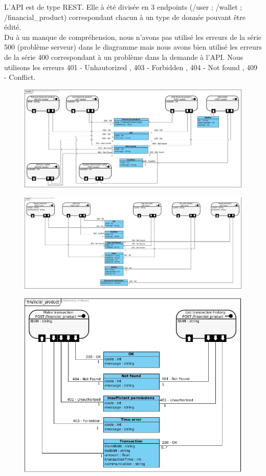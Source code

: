 \documentclass[../rapport.tex]{subfiles}
\begin{document}
L'API est de type REST. Elle à été divisée en 3 endpoints (/user ; /wallet ; /financial\_product) correspondant chacun à un type de donnée pouvant être édité. \\ 
Du à un manque de compréhension, nous n'avons pas utilisé les erreurs de la série 500 (problème serveur) dans le diagramme mais nous avons bien utilisé les erreurs de la série 400 correspondant à un problème dans la demande à l'API. Nous utilisons les erreurs 401 - Unhautorized , 403 - Forbidden , 404 - Not found , 409 - Conflict.

\begin{figure}[H]
    \includegraphics[scale=0.288]{ressources/photos_diagrammes/API/wallet.jpg}
\end{figure}

\begin{figure}[H]
    \includegraphics[scale=0.26]{ressources/photos_diagrammes/API/user.jpg}
\end{figure}


\begin{figure}[H]
    \includegraphics[scale=0.54]{ressources/photos_diagrammes/API/financial_product.jpg}
\end{figure}

\newpage
\end{document}
